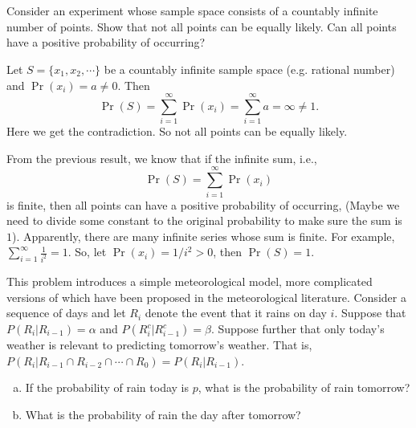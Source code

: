 \documentclass[14pt]{elegantbook}
\begin{document}

\setcounter{chapter}{1}
\chapter{}

    \begin{exercise*}[1]
        Consider an experiment whose sample space consists of a countably infinite number of points. Show that not all points can be equally likely. Can all points have a positive probability of occurring? 
    \end{exercise*}

    \begin{solution}
        Let $S=\{x_1, x_2, \cdots\}$ be a countably infinite sample space (e.g. rational number) and $\Pr(x_i)=a\neq0$. Then 
        \[\Pr(S)=\sum_{i=1}^\infty\Pr(x_i)=\sum_{i=1}^\infty a=\infty\neq 1.\]
        Here we get the contradiction. So not all points can be equally likely. 

        From the previous result, we know that if the infinite sum, i.e., 
        \[\Pr(S)=\sum_{i=1}^\infty \Pr(x_i)\] 
        is finite, then all points can have a positive probability of occurring, (Maybe we need to divide some constant to the original probability to make sure the sum is $1$). Apparently, there are many infinite series whose sum is finite. For example, $\sum_{i=1}^\infty \frac{1}{i^2}=1$. So, let $\Pr(x_i)=1/i^2>0$, then $\Pr(S)=1$. 
    \end{solution}

    \begin{exercise*}[2]
        This problem introduces a simple meteorological model, more complicated versions of which have been proposed in the meteorological literature. Consider a sequence of days and let $R_i$ denote the event that it rains on day $i$. Suppose that $P(R_i|R_{i-1})=\alpha$ and $P(R_i^c|R_{i-1}^c)=\beta$. Suppose further that only today's weather is relevant to predicting tomorrow's weather. That is, $P(R_i|R_{i-1}\cap R_{i-2}\cap \cdots\cap R_0)=P(R_i|R_{i-1})$. 
        \begin{enumerate}[(a)]
            \item If the probability of rain today is $p$, what is the probability of rain tomorrow?
            \item What is the probability of rain the day after tomorrow? 
        \end{enumerate}
    \end{exercise*}
\end{document}
